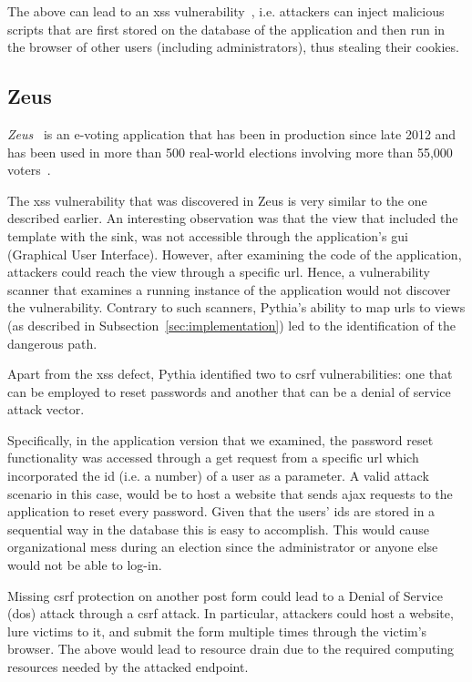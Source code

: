 \noindent
The above can lead to an {\sc xss} vulnerability~\cite{MLPK17},
i.e. attackers can inject malicious scripts
that are first stored on the database
of the application
and then run in the browser of other users
(including administrators),
thus stealing their cookies.

\vspace{-1.5mm}

\subsection{Zeus}
\label{sec:zeus}

{\it Zeus}~\cite{zeus-jets, zeus}
is an e-voting application
that has been in production
since late 2012 and
has been used in more than 500
real-world elections involving
more than 55,000 voters~\cite{pnrmx-del}.

The {\sc xss} vulnerability
that was discovered in Zeus is very
similar to the one described earlier.
An interesting observation
was that the view that included
the template with the sink,
was not accessible through the
application's
{\sc gui} (Graphical User Interface).
However,
after examining the code of the application,
attackers could reach the view through
a specific {\sc url}.
Hence,
a vulnerability scanner that examines
a running instance of the application
would not discover the vulnerability.
Contrary to such scanners,
Pythia's
ability to map {\sc url}s to views
(as described in
Subsection~\ref{sec:implementation})
led to the identification of the
dangerous path.

Apart from the {\sc xss} defect,
Pythia identified two
to {\sc csrf} vulnerabilities:
one that can be employed to reset
passwords and another that
can be a denial of service attack vector.

Specifically,
in the application version that we examined,
the password reset functionality was
accessed through a {\sc get} request from
a specific {\sc url} which incorporated
the {\sc id} (i.e. a number) of a user
as a parameter.
A valid attack scenario in this case,
would be to host a website that sends
{\sc ajax} requests to the application
to reset every password.
Given that the users' {\sc id}s
are stored in a sequential way
in the database this is easy to accomplish.
This would cause organizational mess
during an election since the administrator
or anyone else would not be able to log-in.

Missing {\sc csrf} protection on
another {\sc post} form could lead to
a Denial of Service ({\sc d}o{\sc s})
attack through a {\sc csrf} attack.
In particular,
attackers could host a website,
lure victims to it,
and submit the form multiple times
through the victim's browser.
The above would lead to resource drain
due to the required computing resources
needed by the attacked endpoint.

